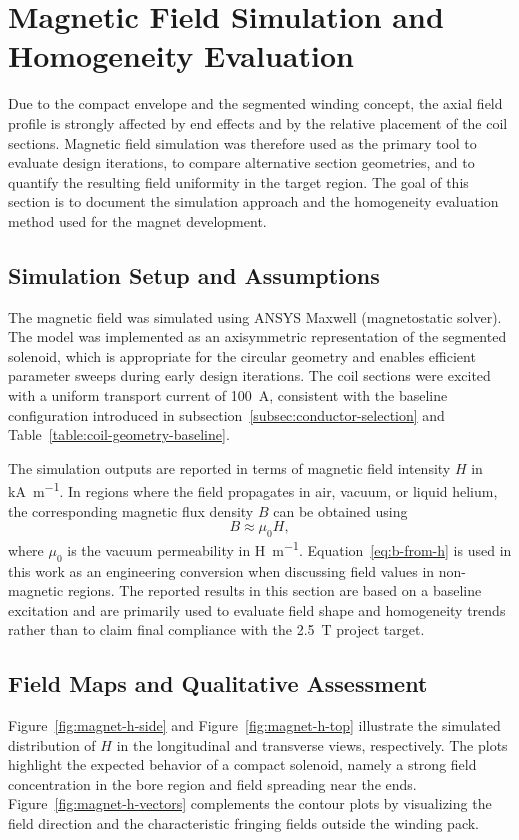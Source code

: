 \documentclass[FM,DP,EN,twoside]{tulthesis}
\begin{document}
\section{Magnetic Field Simulation and Homogeneity Evaluation}
\label{sec:magnet-simulation-homogeneity}
Due to the compact envelope and the segmented winding concept, the axial field profile is strongly affected by end effects and by the relative placement of the coil sections. Magnetic field simulation was therefore used as the primary tool to evaluate design iterations, to compare alternative section geometries, and to quantify the resulting field uniformity in the target region. The goal of this section is to document the simulation approach and the homogeneity evaluation method used for the magnet development.

\subsection{Simulation Setup and Assumptions}
\label{subsec:magnet-simulation-setup}
The magnetic field was simulated using ANSYS Maxwell (magnetostatic solver). The model was implemented as an axisymmetric representation of the segmented solenoid, which is appropriate for the circular geometry and enables efficient parameter sweeps during early design iterations. The coil sections were excited with a uniform transport current of \SI{100}{\ampere}, consistent with the baseline configuration introduced in subsection~\ref{subsec:conductor-selection} and Table~\ref{table:coil-geometry-baseline}.

The simulation outputs are reported in terms of magnetic field intensity $H$ in \si{\kilo\ampere\per\meter}. In regions where the field propagates in air, vacuum, or liquid helium, the corresponding magnetic flux density $B$ can be obtained using
\begin{equation}
B \approx \mu_0 H,
\label{eq:b-from-h}
\end{equation}
where $\mu_0$ is the vacuum permeability in \si{\henry\per\meter}. Equation~\ref{eq:b-from-h} is used in this work as an engineering conversion when discussing field values in non-magnetic regions. The reported results in this section are based on a baseline excitation and are primarily used to evaluate field shape and homogeneity trends rather than to claim final compliance with the \SI{2.5}{\tesla} project target.

\subsection{Field Maps and Qualitative Assessment}
\label{subsec:field-maps-qualitative}
Figure~\ref{fig:magnet-h-side} and Figure~\ref{fig:magnet-h-top} illustrate the simulated distribution of $H$ in the longitudinal and transverse views, respectively. The plots highlight the expected behavior of a compact solenoid, namely a strong field concentration in the bore region and field spreading near the ends. Figure~\ref{fig:magnet-h-vectors} complements the contour plots by visualizing the field direction and the characteristic fringing fields outside the winding pack.
\end{document}
